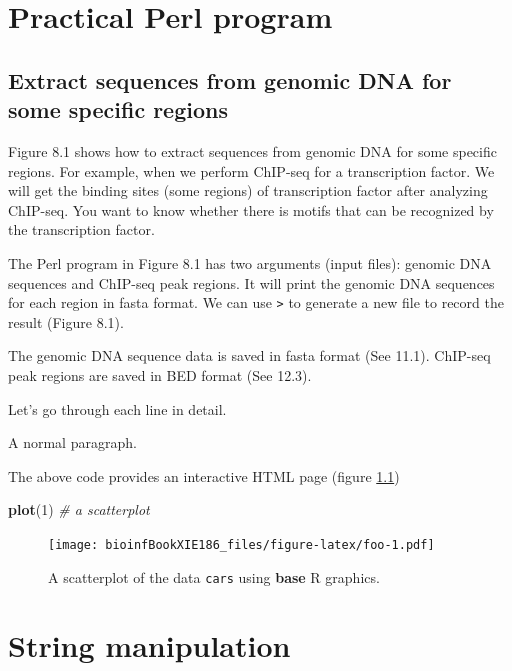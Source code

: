 \documentclass[]{book}
\makeatletter
\newenvironment{Shaded}{\begin{snugshade}}{\end{snugshade}}
\newcommand{\KeywordTok}[1]{\textcolor[rgb]{0.13,0.29,0.53}{\textbf{#1}}}
\newcommand{\DecValTok}[1]{\textcolor[rgb]{0.00,0.00,0.81}{#1}}
\newcommand{\CommentTok}[1]{\textcolor[rgb]{0.56,0.35,0.01}{\textit{#1}}}
\newcommand{\NormalTok}[1]{#1}
\newenvironment{kframe}{%
\medskip{}
\setlength{\fboxsep}{.8em}
 \def\at@end@of@kframe{}%
 \ifinner\ifhmode%
  \def\at@end@of@kframe{\end{minipage}}%
  \begin{minipage}{\columnwidth}%
 \fi\fi%
 \def\FrameCommand##1{\hskip\@totalleftmargin \hskip-\fboxsep
 \colorbox{shadecolor}{##1}\hskip-\fboxsep
     \hskip-\linewidth \hskip-\@totalleftmargin \hskip\columnwidth}%
 \MakeFramed {\advance\hsize-\width
   \@totalleftmargin\z@ \linewidth\hsize
   \@setminipage}}%
 {\par\unskip\endMakeFramed%
 \at@end@of@kframe}
\renewenvironment{Shaded}{\begin{kframe}}{\end{kframe}}
\theoremstyle{definition}
\theoremstyle{definition}
\theoremstyle{definition}
\theoremstyle{remark}
\makeatother
\begin{document}
\chapter{Practical Perl program}\label{practical-perl-program}

\section{Extract sequences from genomic DNA for some specific
regions}\label{extract-sequences-from-genomic-dna-for-some-specific-regions}

Figure 8.1 shows how to extract sequences from genomic DNA for some
specific regions. For example, when we perform ChIP-seq for a
transcription factor. We will get the binding sites (some regions) of
transcription factor after analyzing ChIP-seq. You want to know whether
there is motifs that can be recognized by the transcription factor.

The Perl program in Figure 8.1 has two arguments (input files): genomic
DNA sequences and ChIP-seq peak regions. It will print the genomic DNA
sequences for each region in fasta format. We can use
\texttt{\textgreater{}} to generate a new file to record the result
(Figure 8.1).

The genomic DNA sequence data is saved in fasta format (See 11.1).
ChIP-seq peak regions are saved in BED format (See 12.3).

Let's go through each line in detail.

A normal paragraph.

The above code provides an interactive HTML page (figure \ref{fig:foo})




\begin{Shaded}
\begin{Highlighting}[]
\KeywordTok{plot}\NormalTok{(}\DecValTok{1}\NormalTok{)  }\CommentTok{# a scatterplot}
\end{Highlighting}
\end{Shaded}

\begin{figure}
\centering
\texttt{[image: bioinfBookXIE186\_files/figure-latex/foo-1.pdf]}
\caption{\label{fig:foo}A scatterplot of the data \texttt{cars} using \textbf{base} R
graphics.}
\end{figure}

\chapter{String manipulation}\label{string-manipulation-1}
\end{document}
